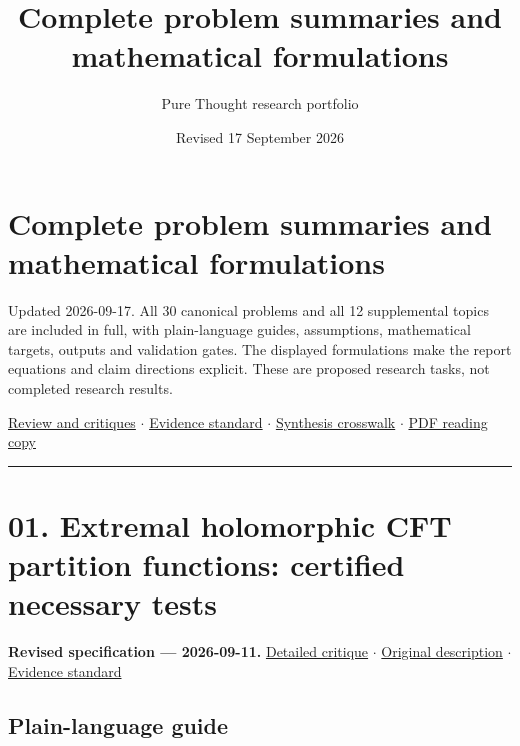 \documentclass[
  11pt,
]{article}
\title{Complete problem summaries and mathematical formulations}
\author{Pure Thought research portfolio}
\date{Revised 17 September 2026}
\begin{document}
\maketitle
\thispagestyle{empty}
\clearpage

{
\setcounter{tocdepth}{1}
\tableofcontents
\clearpage
}
\section{Complete problem summaries and mathematical formulations}

Updated 2026-09-17. All 30 canonical problems and all 12 supplemental
topics are included in full, with plain-language guides, assumptions,
mathematical targets, outputs and validation gates. The displayed
formulations make the report equations and claim directions explicit.
These are proposed research tasks, not completed research results.

\href{https://github.com/rick-stevens-ai/Pure-Thought/blob/main/reviews/COMPLETE-REVIEW.md}{Review
and critiques} \ensuremath{\cdot}
\href{https://github.com/rick-stevens-ai/Pure-Thought/blob/main/reviews/EVIDENCE-STANDARD.md}{Evidence
standard} \ensuremath{\cdot}
\href{https://github.com/rick-stevens-ai/Pure-Thought/blob/main/reviews/SYNTHESIS-CROSSWALK.md}{Synthesis
crosswalk} \ensuremath{\cdot}
\href{https://github.com/rick-stevens-ai/Pure-Thought/blob/main/latex-reports/Complete-Problem-Summaries.pdf}{PDF
reading copy}

\begin{center}\rule{0.5\linewidth}{0.5pt}\end{center}

\section{01. Extremal holomorphic CFT partition functions: certified
necessary tests}

\textbf{Revised specification --- 2026-09-11.}
\href{https://github.com/rick-stevens-ai/Pure-Thought/blob/main/reviews/01-AdS3-Modular-Bootstrap.md}{Detailed
critique} \ensuremath{\cdot}
\href{https://github.com/rick-stevens-ai/Pure-Thought/blob/main/archive/original-PRDs/01-AdS3-Modular-Bootstrap.md}{Original
description} \ensuremath{\cdot}
\href{https://github.com/rick-stevens-ai/Pure-Thought/blob/main/reviews/EVIDENCE-STANDARD.md}{Evidence
standard}

\subsection{Plain-language guide}
\end{document}
